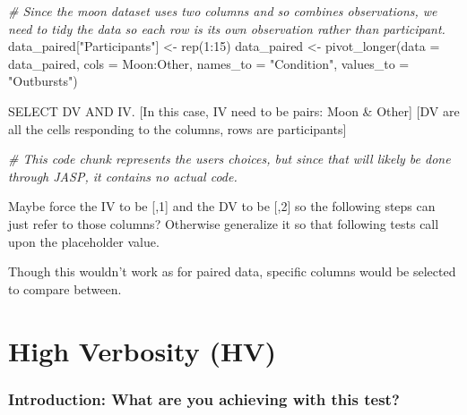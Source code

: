 \documentclass[
]{article}
\newenvironment{Shaded}{\begin{snugshade}}{\end{snugshade}}
\newcommand{\AttributeTok}[1]{\textcolor[rgb]{0.77,0.63,0.00}{#1}}
\newcommand{\CommentTok}[1]{\textcolor[rgb]{0.56,0.35,0.01}{\textit{#1}}}
\newcommand{\DecValTok}[1]{\textcolor[rgb]{0.00,0.00,0.81}{#1}}
\newcommand{\FunctionTok}[1]{\textcolor[rgb]{0.00,0.00,0.00}{#1}}
\newcommand{\NormalTok}[1]{#1}
\newcommand{\OtherTok}[1]{\textcolor[rgb]{0.56,0.35,0.01}{#1}}
\newcommand{\SpecialCharTok}[1]{\textcolor[rgb]{0.00,0.00,0.00}{#1}}
\newcommand{\StringTok}[1]{\textcolor[rgb]{0.31,0.60,0.02}{#1}}
\begin{document}
\begin{Shaded}
\begin{Highlighting}[]
\CommentTok{\# Since the moon dataset uses two columns and so combines observations, we need to tidy the data so each row is its own observation rather than participant. }
\NormalTok{data\_paired[}\StringTok{"Participants"}\NormalTok{] }\OtherTok{\textless{}{-}} \FunctionTok{rep}\NormalTok{(}\DecValTok{1}\SpecialCharTok{:}\DecValTok{15}\NormalTok{)}
\NormalTok{data\_paired }\OtherTok{\textless{}{-}} \FunctionTok{pivot\_longer}\NormalTok{(}\AttributeTok{data =}\NormalTok{ data\_paired,}
                            \AttributeTok{cols =}\NormalTok{ Moon}\SpecialCharTok{:}\NormalTok{Other,}
                            \AttributeTok{names\_to =} \StringTok{"Condition"}\NormalTok{,}
                            \AttributeTok{values\_to =} \StringTok{"Outbursts"}\NormalTok{)}
\end{Highlighting}
\end{Shaded}

SELECT DV AND IV. {[}In this case, IV need to be pairs: Moon \& Other{]}
{[}DV are all the cells responding to the columns, rows are
participants{]}

\begin{Shaded}
\begin{Highlighting}[]
\CommentTok{\# This code chunk represents the user\textquotesingle{}s choices, but since that will likely be done through JASP, it contains no actual code. }
\end{Highlighting}
\end{Shaded}

Maybe force the IV to be {[},1{]} and the DV to be {[},2{]} so the
following steps can just refer to those columns? Otherwise generalize it
so that following tests call upon the placeholder value.

Though this wouldn't work as for paired data, specific columns would be
selected to compare between.

\hypertarget{high-verbosity-hv}{%
\section{High Verbosity (HV)}\label{high-verbosity-hv}}

\hypertarget{introduction-what-are-you-achieving-with-this-test}{%
\subsubsection{Introduction: What are you achieving with this
test?}\label{introduction-what-are-you-achieving-with-this-test}}
\end{document}
